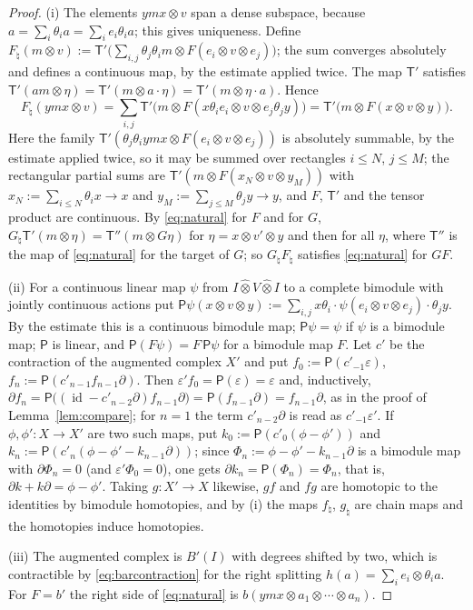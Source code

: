 \documentclass[11pt]{amsart}
\theoremstyle{definition}
\theoremstyle{remark}
\newcommand{\id}{\operatorname{id}}
\begin{document}
\begin{proof}
(i) The elements $ymx\otimes v$ span a dense subspace, because
$a=\sum_i\theta_ia=\sum_ie_i\theta_ia$; this gives uniqueness.  Define
$F_{\natural}(m\otimes v):=\mathsf T'\bigl(\sum_{i,j}\theta_j\theta_im\otimes F(e_i\otimes
v\otimes e_j)\bigr)$; the sum converges absolutely and defines a continuous
map, by the estimate applied twice.  The map $\mathsf T'$ satisfies
$\mathsf T'(am\otimes\eta)=\mathsf T'(m\otimes a\cdot\eta)=\mathsf T'(m\otimes\eta\cdot a)$.  Hence
\[
F_{\natural}(ymx\otimes v)=\sum_{i,j}\mathsf T'\bigl(m\otimes F(x\theta_ie_i\otimes v\otimes
e_j\theta_jy)\bigr)=\mathsf T'\bigl(m\otimes F(x\otimes v\otimes y)\bigr).
\]
Here the family $\mathsf T'(\theta_j\theta_iymx\otimes F(e_i\otimes v\otimes e_j))$
is absolutely summable, by the estimate applied twice, so it may be summed over
rectangles $i\le N$, $j\le M$; the rectangular partial sums are
$\mathsf T'(m\otimes F(x_N\otimes v\otimes y_M))$ with
$x_N:=\sum_{i\le N}\theta_ix\to x$ and $y_M:=\sum_{j\le M}\theta_jy\to y$, and
$F$, $\mathsf T'$ and the tensor product are continuous.
By \eqref{eq:natural} for $F$ and for $G$, $G_{\natural}\mathsf T'(m\otimes\eta)=
\mathsf T''(m\otimes G\eta)$ for $\eta=x\otimes v'\otimes y$ and then for all $\eta$, where
$\mathsf T''$ is the map of \eqref{eq:natural} for the target of $G$; so
$G_{\natural}F_{\natural}$ satisfies \eqref{eq:natural} for $GF$.

(ii) For a continuous linear map $\psi$ from $I\widehat\otimes V\widehat\otimes
I$ to a complete bimodule with jointly continuous actions put
$\mathsf P\psi(x\otimes v\otimes y):=\sum_{i,j}x\theta_i\cdot\psi(e_i\otimes
v\otimes e_j)\cdot\theta_jy$.  By the estimate this is a continuous bimodule
map; $\mathsf P\psi=\psi$ if $\psi$ is a bimodule map; $\mathsf P$ is linear, and
$\mathsf P(F\psi)=F\,\mathsf P\psi$ for a bimodule map $F$.  Let $c'$ be the
contraction of the augmented complex $X'$ and put
$f_0:=\mathsf P(c'_{-1}\varepsilon)$, $f_n:=\mathsf P(c'_{n-1}f_{n-1}\partial)$.
Then $\varepsilon'f_0=\mathsf P(\varepsilon)=\varepsilon$ and, inductively,
$\partial f_n=\mathsf P\bigl((\id-c'_{n-2}\partial)f_{n-1}\partial\bigr)
=\mathsf P(f_{n-1}\partial)=f_{n-1}\partial$, as in the proof of
Lemma~\ref{lem:compare}; for $n=1$ the term $c'_{n-2}\partial$ is read as
$c'_{-1}\varepsilon'$.  If $\phi,\phi':X\to X'$ are two such maps, put
$k_0:=\mathsf P(c'_0(\phi-\phi'))$ and
$k_n:=\mathsf P(c'_n(\phi-\phi'-k_{n-1}\partial))$; since
$\Phi_n:=\phi-\phi'-k_{n-1}\partial$ is a bimodule map with $\partial\Phi_n=0$
(and $\varepsilon'\Phi_0=0$), one gets
$\partial k_n=\mathsf P(\Phi_n)=\Phi_n$, that is,
$\partial k+k\partial=\phi-\phi'$.  Taking $g:X'\to X$ likewise, $gf$ and $fg$
are homotopic to the identities by bimodule homotopies, and by (i) the maps
$f_{\natural}$, $g_{\natural}$ are chain maps and the homotopies induce
homotopies.

(iii) The augmented complex is $B'(I)$ with degrees shifted by two, which is
contractible by \eqref{eq:barcontraction} for the right splitting
$h(a)=\sum_ie_i\otimes\theta_ia$.  For $F=b'$ the right side of
\eqref{eq:natural} is $b(ymx\otimes a_1\otimes\cdots\otimes a_n)$.
\end{proof}
\end{document}
